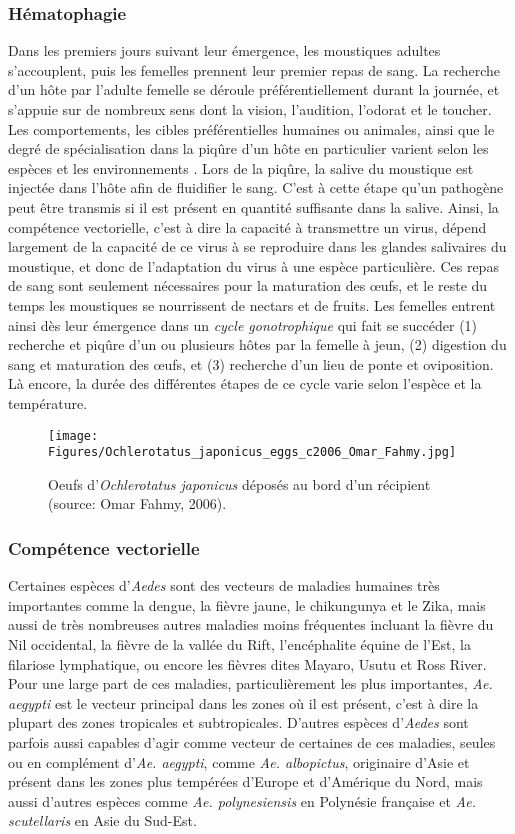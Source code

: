 \subsubsection{Hématophagie}
Dans les premiers jours suivant leur émergence, les moustiques adultes s'accouplent, puis les femelles prennent leur premier repas de sang. 
La recherche d'un hôte par l'adulte femelle se déroule préférentiellement durant la journée, et s'appuie sur de nombreux sens dont la vision, l'audition, l'odorat et le toucher. 
Les comportements, les cibles préférentielles humaines ou animales, ainsi que le degré de spécialisation dans la piqûre d'un hôte en particulier varient selon les espèces et les environnements \cite{bowen1991sensory}.
Lors de la piqûre, la salive du moustique est injectée dans l'hôte afin de fluidifier le sang. 
C'est à cette étape qu'un pathogène peut être transmis si il est présent en quantité suffisante dans la salive.
Ainsi, la compétence vectorielle, c'est à dire la capacité à transmettre un virus, dépend largement de la capacité de ce virus à se reproduire dans les glandes salivaires du moustique, et donc de l'adaptation du virus à une espèce particulière.
Ces repas de sang sont seulement nécessaires pour la maturation des \oe ufs, et le reste du temps les moustiques se nourrissent de nectars et de fruits.
Les femelles entrent ainsi dès leur émergence dans un {\em cycle gonotrophique} qui fait se succéder (1) recherche et piqûre d'un ou plusieurs hôtes par la femelle à jeun, (2) digestion du sang et maturation des \oe ufs, et (3) recherche d'un lieu de ponte et oviposition.
Là encore, la durée des différentes étapes de ce cycle varie selon l'espèce et la température.


\begin{figure}[h]
	\centering
	\texttt{[image: Figures/Ochlerotatus\_japonicus\_eggs\_c2006\_Omar\_Fahmy.jpg]}
	\caption{Oeufs d'{\em Ochlerotatus japonicus} déposés au bord d'un récipient (source: Omar Fahmy, 2006).}
	\label{fig:oeufsbord}
\end{figure}

\subsubsection{Compétence vectorielle}
Certaines espèces d'{\em Aedes} sont des vecteurs de maladies humaines très importantes comme la dengue, la fièvre jaune, le chikungunya et le Zika, mais aussi de très nombreuses autres maladies moins fréquentes incluant la fièvre du Nil occidental, la fièvre de la vallée du Rift, l'encéphalite équine de l'Est, la filariose lymphatique, ou encore les fièvres dites Mayaro, Usutu et Ross River.
Pour une large part de ces maladies, particulièrement les plus importantes, {\em Ae. aegypti} est le vecteur principal dans les zones où il est présent, c'est à dire la plupart des zones tropicales et subtropicales.
D'autres espèces d'{\em Aedes} sont parfois aussi capables d'agir comme vecteur de certaines de ces maladies, seules ou en complément d'{\em Ae. aegypti}, comme {\em Ae. albopictus}, originaire d'Asie et présent dans les zones plus tempérées d'Europe et d'Amérique du Nord, mais aussi d'autres espèces comme {\em Ae. polynesiensis} en Polynésie française et {\em Ae. scutellaris} en Asie du Sud-Est.

